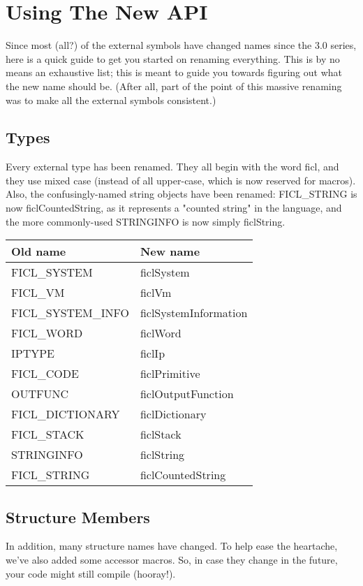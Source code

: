 \section{Using The New API}
Since most (all?) of the external symbols have changed names since the
3.0 series, here is a quick guide to get you started on renaming
everything. This is by no means an exhaustive list; this is meant to
guide you towards figuring out what the new name should be. (After all,
part of the point of this massive renaming was to make all the external
symbols consistent.)


\subsection{Types}
Every external type has been renamed. They all begin with the word ficl,
and they use mixed case (instead of all upper-case, which is now
reserved for macros). Also, the confusingly-named string objects have
been renamed: FICL\_STRING is now ficlCountedString, as it represents a
"counted string" in the language, and the more commonly-used STRINGINFO
is now simply ficlString.

\begin{tabular}{| l | l |}
	\hline
	\textbf{Old name} & \textbf{New name} \\ \hline
	FICL\_SYSTEM & ficlSystem \\ \hline
	FICL\_VM & ficlVm \\ \hline
	FICL\_SYSTEM\_INFO & ficlSystemInformation \\ \hline
	FICL\_WORD & ficlWord \\ \hline
	IPTYPE & ficlIp \\ \hline
	FICL\_CODE & ficlPrimitive \\ \hline
	OUTFUNC & ficlOutputFunction \\ \hline
	FICL\_DICTIONARY & ficlDictionary \\ \hline
	FICL\_STACK & ficlStack \\ \hline
	STRINGINFO & ficlString \\ \hline
	FICL\_STRING & ficlCountedString \\
	\hline
\end{tabular}


\subsection{Structure Members}
In addition, many structure names have changed. To help ease the
heartache, we've also added some accessor macros. So, in case they
change in the future, your code might still compile (hooray!).

